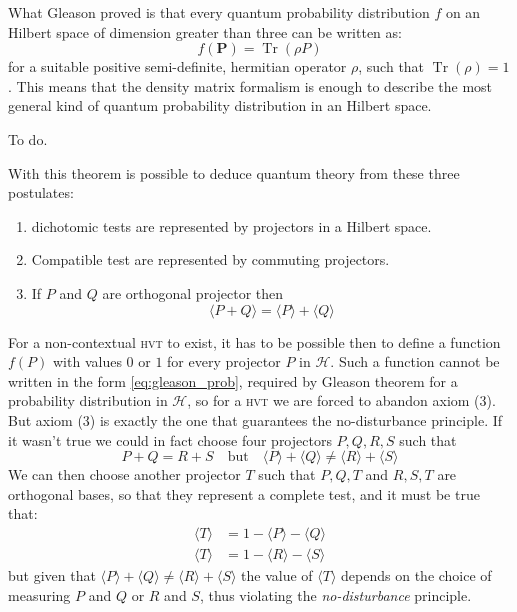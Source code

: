 \documentclass[a4paper]{article}
\DeclareMathOperator{\Tr}{Tr}
\newcommand{\Hil}{\mathcal{H}}
\newcommand{\op}[1]{\mathbf{#1}}
\newcommand{\acron}[1]{\textsc{#1}}
\newcommand{\HVT}{\acron{hvt}}
\theoremstyle{definition}
\let\oldproof\proof
\let\oldendproof\endproof
\renewenvironment{proof}
    {
        \begin{framed} 
        \oldproof
    }
    {
        \oldendproof 
        \end{framed}
    }
\begin{document}
What Gleason proved is that every quantum probability distribution $f$ on an Hilbert space
of dimension greater than three can be written as:
\begin{equation}
    f(\op P) = \Tr(\rho P)
    \label{eq:gleason_prob}
\end{equation}
for a suitable positive semi-definite, hermitian operator $\rho$, such that
$\Tr(\rho) = 1$.
This means that the density matrix formalism is enough to describe the most general kind of
quantum probability distribution in an Hilbert space.

\begin{proof}
    To do.
\end{proof}

With this theorem is possible to deduce quantum theory from these three
postulates:
\begin{enumerate}
    \item dichotomic tests are represented by projectors in a Hilbert space.
    \item Compatible test are represented by commuting projectors.
    \item If $P$ and $Q$ are orthogonal projector then
        \begin{equation}
            \langle{P + Q}\rangle = \langle{P}\rangle + \langle{Q}\rangle
            \label{eq:QM_axiom3}
        \end{equation}
\end{enumerate}

For a non-contextual \HVT{} to exist, it has to be possible then to define a function $f(P)$ with values
$0$ or $1$ for every projector $P$ in $\Hil$.
Such a function cannot be written in the form \eqref{eq:gleason_prob}, required
by Gleason theorem for a probability distribution in $\Hil$, so for a \HVT{} we
are forced to abandon axiom (3).
But axiom (3) is exactly the one that guarantees the no-disturbance
principle.
If it wasn't true we could in fact choose four projectors $P,Q,R,S$ such that
\begin{equation}
    P+Q = R+S \quad \text{but} \quad 
        \langle{P}\rangle + \langle{Q}\rangle \neq
        \langle{R}\rangle + \langle{S}\rangle
\end{equation}
We can then choose another projector $T$ such that $P,Q,T$ and $R,S,T$ are
orthogonal bases, so that they represent a complete test, and it must be true that:
\begin{align}
    \langle{T}\rangle &= 1 - \langle{P}\rangle - \langle{Q}\rangle\\
    \langle{T}\rangle &= 1 - \langle{R}\rangle - \langle{S}\rangle
    \label{eq:no-dist_violation}
\end{align}
but given that $\langle{P}\rangle+\langle{Q}\rangle \neq
\langle{R}\rangle+\langle{S}\rangle$ the value of $\langle{T}\rangle$ depends on
the choice of measuring $P$ and $Q$ or $R$ and $S$, thus violating the
\emph{no-disturbance} principle.
\end{document}
